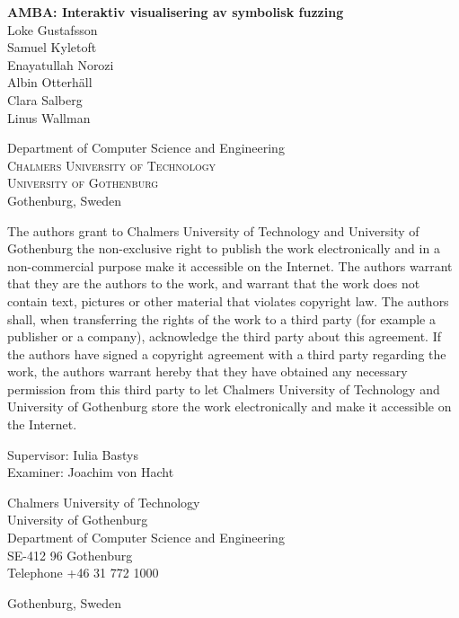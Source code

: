 \newpage
\thispagestyle{empty}
\begin{center}

	\textbf{\Large AMBA: Interaktiv visualisering av symbolisk fuzzing} \\[1cm]

    {\linespread{1.2}\large
	Loke Gustafsson \\
	Samuel Kyletoft \\
	Enayatullah Norozi \\
	Albin Otterhäll \\
	Clara Salberg \\
	Linus Wallman \\
    }
	
	\vfill 	

	Department of Computer Science and Engineering\\
	\textsc{Chalmers University of Technology} \\
	\textsc{University of Gothenburg} \\
    Gothenburg, Sweden \the\year{} \\
\end{center}


\newpage
{The authors grant to Chalmers University of Technology and University of Gothenburg the
non-exclusive right to publish the work electronically and in a non-commercial purpose make it
accessible on the Internet. The authors warrant that they are the authors to the work, and
warrant that the work does not contain text, pictures or other material that violates
copyright law.
The authors shall, when transferring the rights of the work to a third party (for example a
publisher or a company), acknowledge the third party about this agreement. If the authors have
signed a copyright agreement with a third party regarding the work, the authors warrant
hereby that they have obtained any necessary permission from this third party to let Chalmers
University of Technology and University of Gothenburg store the work electronically and make
it accessible on the Internet.}

Supervisor: Iulia Bastys \\
Examiner: Joachim von Hacht \setlength{\parskip}{1cm}

Chalmers University of Technology\\
University of Gothenburg\\
Department of Computer Science and Engineering \\
SE-412 96 Gothenburg\\
Telephone +46 31 772 1000 \setlength{\parskip}{0.5cm}

\vfill
Gothenburg, Sweden \the\year{}
